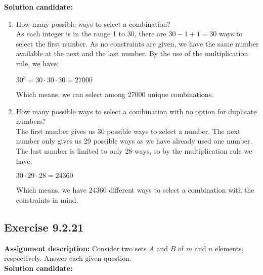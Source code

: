 \documentclass{report}
\newcommand{\cent}[1]{\begin{center}#1\end{center}}
\newcommand{\AssignmentDescription}{\textbf{Assignment description: }}
\newcommand{\Solution}{\textbf{Solution candidate: }}
\newcommand{\Exercise}[1]{\subsection{Exercise #1}}
\newcommand{\defaultEnumerateLabel}{\textbf{\alph*.}}
\newcommand{\MyItem}[1]{\item #1\\}
\begin{document}
 	\Solution
 	
 	\begin{enumerate}[label=\defaultEnumerateLabel]
 		\MyItem{How many possible ways to select a combination?}
 		
 		As each integer is in the range 1 to 30, there are $30-1+1 = 30$ ways to select the first number. As no constraints are given, we have the same number available at the next and the last number. By the use of the multiplication rule, we have:
 		
 		\cent{$30^3 = 30 \cdot 30 \cdot 30 = 27000$}
 		
 		Which means, we can select among 27000 unique combinations.\\
 		
 		\MyItem{How many possible ways to select a combination with no option for duplicate numbers?}
 		
 		The first number gives us 30 possible ways to select a number. The next number only gives us 29 possible ways as we have already used one number. The last number is limited to only 28 ways, so by the multiplication rule we have:
 		
 		
 		\cent{$30 \cdot 29 \cdot 28 = 24360$}
 		
 		Which means, we have 24360 different ways to select a combination with the constraints in mind.\\
 		
 	\end{enumerate}
 	\Exercise{9.2.21}
 	
 	\AssignmentDescription
 	Consider two sets $A$ and $B$ of $m$ and $n$ elements, respectively. Answer each given question.\\
 	
 	\Solution
 	
\end{document}
